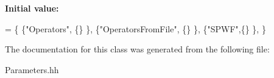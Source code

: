 {\bfseries Initial value\+:}
\begin{DoxyCode}
= \{
 \{\textcolor{stringliteral}{"Operators"}, \{\} \},
 \{\textcolor{stringliteral}{"OperatorsFromFile"}, \{\} \},  
 \{\textcolor{stringliteral}{"SPWF"},\{\} \}, 
\}
\end{DoxyCode}


The documentation for this class was generated from the following file\+:\begin{DoxyCompactItemize}
\item 
Parameters.\+hh\end{DoxyCompactItemize}
